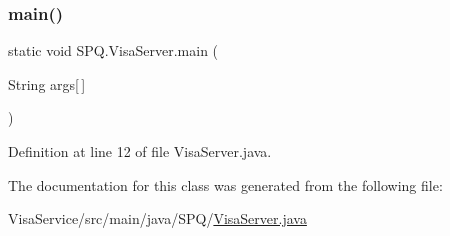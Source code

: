 \subsubsection{\texorpdfstring{main()}{main()}}
{\footnotesize\ttfamily static void S\+P\+Q.\+Visa\+Server.\+main (\begin{DoxyParamCaption}\item[{String}]{args\mbox{[}$\,$\mbox{]} }\end{DoxyParamCaption})\hspace{0.3cm}{\ttfamily [static]}}



Definition at line 12 of file Visa\+Server.\+java.



The documentation for this class was generated from the following file\+:\begin{DoxyCompactItemize}
\item 
Visa\+Service/src/main/java/\+S\+P\+Q/\mbox{\hyperlink{_visa_server_8java}{Visa\+Server.\+java}}\end{DoxyCompactItemize}
